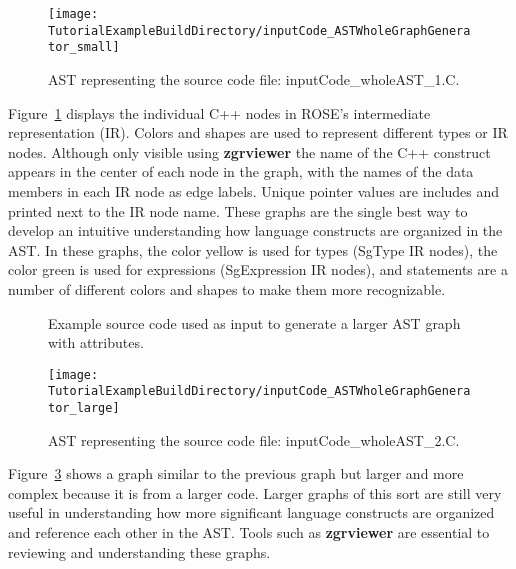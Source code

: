 \begin{figure}
\texttt{[image: \\TutorialExampleBuildDirectory/inputCode\_ASTWholeGraphGenerator\_small]}
\caption{AST representing the source code file: inputCode\_wholeAST\_1.C.}
\label{tutorial:exampleOutputCodeWholeGraph_small}
\end{figure}

   Figure~\ref{tutorial:exampleOutputCodeWholeGraph_small} displays the individual
C++ nodes in ROSE's intermediate representation (IR).  Colors and shapes are used to 
represent different types or IR nodes. Although only visible using {\bf zgrviewer} 
the name of the C++ construct appears in the center of each node in the graph, with 
the names of the data members in each IR node as edge labels. Unique pointer values
are includes and printed next to the IR node name.  These graphs are the single best
way to develop an intuitive understanding how language constructs are organized
in the AST.  In these graphs, the color yellow is used for types (SgType IR nodes),
the color green is used for expressions (SgExpression IR nodes), and statements
are a number of different colors and shapes to make them more recognizable.


\begin{figure}[!h]
{\indent
{\mySmallFontSize

\begin{latexonly}
   
\end{latexonly}

\begin{htmlonly}
   
\end{htmlonly}

}
}
\caption{Example source code used as input to generate a larger AST graph with attributes.}
\label{Tutorial:exampleInputCode_ASTGraphGenerator_large}
\end{figure}

\begin{figure}
\texttt{[image: \\TutorialExampleBuildDirectory/inputCode\_ASTWholeGraphGenerator\_large]}
\caption{AST representing the source code file: inputCode\_wholeAST\_2.C.}
\label{tutorial:exampleOutputCodeWholeGraph_large}
\end{figure}

   Figure~\ref{tutorial:exampleOutputCodeWholeGraph_large} shows a graph similar to the
previous graph but larger and more complex because it is from a larger code. Larger
graphs of this sort are still very useful in understanding how more significant
language constructs are organized and reference each other in the AST.  Tools
such as {\bf zgrviewer} are essential to reviewing and understanding these
graphs.

